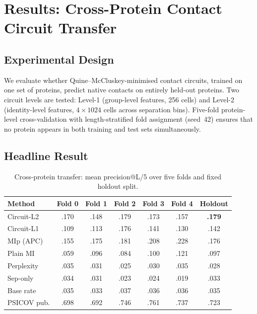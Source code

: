 \section{Results: Cross-Protein Contact Circuit Transfer}
\label{sec:results-transfer}

\subsection{Experimental Design}
We evaluate whether Quine--McCluskey-minimised contact circuits, trained on
one set of proteins, predict native contacts on entirely held-out proteins.
Two circuit levels are tested: Level-1 (group-level features, 256 cells) and
Level-2 (identity-level features, $4 \times 1024$ cells across separation
bins).  Five-fold protein-level cross-validation with length-stratified fold
assignment (seed~42) ensures that no protein appears in both training and test
sets simultaneously.

\subsection{Headline Result}
\begin{table}[ht]
	\centering
	\caption{Cross-protein transfer: mean precision@L/5 over five folds and fixed holdout split.}
	\label{tab:transfer}
	\begin{tabular}{lccccc|c}
		\toprule
		Method      & Fold 0 & Fold 1 & Fold 2 & Fold 3 & Fold 4 & Holdout       \\
		\midrule
		Circuit-L2  & .170   & .148   & .179   & .173   & .157   & \textbf{.179} \\
		Circuit-L1  & .109   & .113   & .176   & .141   & .130   & .142          \\
		MIp (APC)   & .155   & .175   & .181   & .208   & .228   & .176          \\
		Plain MI    & .059   & .096   & .084   & .100   & .121   & .097          \\
		Perplexity  & .035   & .031   & .025   & .030   & .035   & .028          \\
		Sep-only    & .034   & .031   & .023   & .024   & .019   & .033          \\
		Base rate   & .035   & .033   & .037   & .036   & .036   & .035          \\
		\midrule
		PSICOV pub. & .698   & .692   & .746   & .761   & .737   & .723          \\
		\bottomrule
	\end{tabular}
\end{table}

